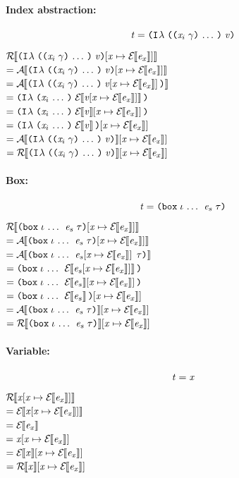\begin{sproof}
\paragraph{Index abstraction:}
\[\term = \ilam{\sequence{\notevar{\var_i}{\sort}}}{\val}\]
$\EraseTrm{\eexprsubst{\ilam{\sequence{\notevar{\var_i}{\sort}}}{\val}}}$ \\
$= \EraseA{\eexprsubst{\ilam{\sequence{\notevar{\var_i}{\sort}}}{\val}}}$ \\
$= \EraseA{\ilam{\sequence{\notevar{\var_i}{\sort}}}{\eexprsubst{\val}}}$ \\
$= \ilam{\sequence{\var_i}}{\EraseE{\eexprsubst{\val}}}$ \\
$= \ilam{\sequence{\var_i}}{\exprsubstE{\val}}$ \\
$= \eexprsubst{\ilam{\sequence{\var_i}}{\EraseE{\val}}}$ \\
$= \eatomsubstE{\ilam{\sequence{\notevar{\var_i}{\sort}}}{\val}}$ \\
$= \etrmsubstE{\ilam{\sequence{\notevar{\var_i}{\sort}}}{\val}}$ \\

\paragraph{Box:}
\[\term = \dsum{\sequence{\idx}}{\expr_s}{\type}\]
$\EraseTrm{\eexprsubst{\dsum{\sequence{\idx}}{\expr_s}{\type}}}$ \\
$= \EraseA{\eexprsubst{\dsum{\sequence{\idx}}{\expr_s}{\type}}}$ \\
$= \EraseA{\dsum{\sequence{\idx}}{\eexprsubst{\expr_s}}{\type}}$ \\
$= \dsum{\sequence{\idx}}{\EraseE{\eexprsubst{\expr_s}}}{}$ \\
$= \dsum{\sequence{\idx}}{\exprsubstE{\expr_s}}{}$ \\
$= \eexprsubst{\dsum{\sequence{\idx}}{\EraseE{\expr_s}}{}}$ \\
$= \eatomsubstE{\dsum{\sequence{\idx}}{\expr_s}{\type}}$ \\
$= \etrmsubstE{\dsum{\sequence{\idx}}{\expr_s}{\type}}$ \\

\paragraph{Variable:}
\[\term = \var\]
$\EraseTrm{\eexprsubst{\var}}$ \\
$= \EraseE{\eexprsubst{\var}}$ \\
$= \EraseE{\expr_\var}$ \\
$= \eexprsubst{\var}$ \\
$= \exprsubstE{\var}$ \\
$= \etrmsubstE{\var}$ \\


\end{sproof}
